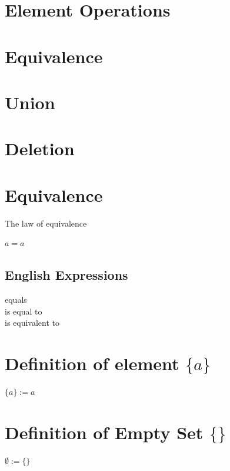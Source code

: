 \documentclass[11pt]{article}
\begin{document}
\section*{Element Operations}

\section{Equivalence}
\section{Union}
\section{Deletion}














\newpage
\section{Equivalence}
The law of equivalence
\begin{center}
$
a = a
$
\end{center}
\subsection{English Expressions}
equals\\
is equal to\\
is equivalent to\\




\section{Definition of element $\{a\}$}
\begin{center}
$
\{a\} := a
$
\\ \vspace{2mm}
\end{center}




\section{Definition of Empty Set $\{\}$}
\begin{center}
$
\emptyset := \{\}
$
\end{center}
\end{document}
